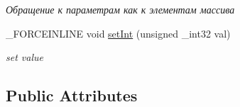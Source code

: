 \begin{DoxyCompactItemize}
\begin{DoxyCompactList}\small\item\em Обращение к параметрам как к элементам массива \end{DoxyCompactList}\item 
\hypertarget{classbt_1_1vector4b_a7b82a9e1725cd5cd6b47150984ee3fbe}{\-\_\-\-F\-O\-R\-C\-E\-I\-N\-L\-I\-N\-E void \hyperlink{classbt_1_1vector4b_a7b82a9e1725cd5cd6b47150984ee3fbe}{set\-Int} (unsigned \-\_\-int32 val)}\label{classbt_1_1vector4b_a7b82a9e1725cd5cd6b47150984ee3fbe}

\begin{DoxyCompactList}\small\item\em set value \end{DoxyCompactList}\end{DoxyCompactItemize}
\subsection*{Public Attributes}
